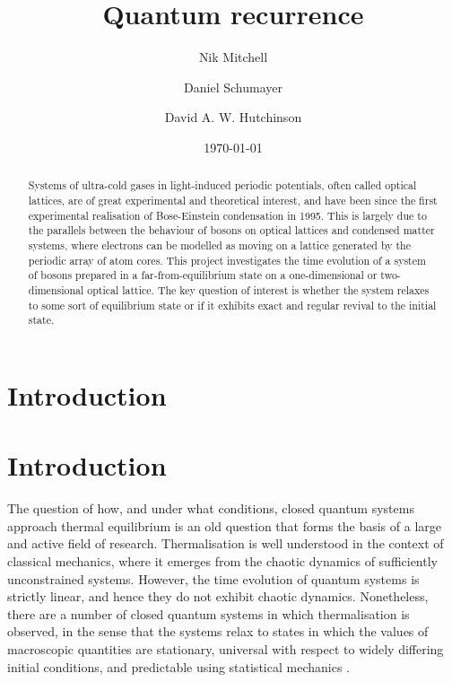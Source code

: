 \documentclass[prb, twocolumn, final]{revtex4-1}
\theoremstyle{plain}
\begin{document}
\title{Quantum recurrence}
\author{Nik Mitchell}
\author{Daniel Schumayer}
\author{David A. W. Hutchinson}
\date{\today}

\begin{abstract}
    Systems of ultra-cold gases in light-induced periodic potentials, often
    called optical lattices, are of great experimental and theoretical interest,
    and have been since the first experimental realisation of Bose-Einstein
    condensation in 1995. This is largely due to the parallels between the
    behaviour of bosons on optical lattices and condensed matter systems, where
    electrons can be modelled as moving on a lattice generated by the periodic
    array of atom cores. This project investigates the time evolution of a
    system of bosons prepared in a far-from-equilibrium state on a
    one-dimensional or two-dimensional optical lattice. The key question of
    interest is whether the system relaxes to some sort of equilibrium state or
    if it exhibits exact and regular revival to the initial state.
\end{abstract}

\pacs{}

\maketitle



\section{Introduction}

\section*{Introduction}
The question of how, and under what conditions, closed quantum systems approach
thermal equilibrium is an old question that forms the basis of a large and
active field of research. Thermalisation is well understood in the context
of classical mechanics, where it emerges from the chaotic
dynamics of sufficiently unconstrained systems. However, the time evolution of
quantum systems is strictly linear, and hence they do not exhibit chaotic
dynamics. Nonetheless, there are a number of closed quantum systems in which
thermalisation is observed, in the sense that the systems relax to states in
which the values of macroscopic quantities are stationary, universal with
respect to widely differing initial conditions, and predictable using
statistical mechanics \cite{Rigol2008}.
\end{document}
